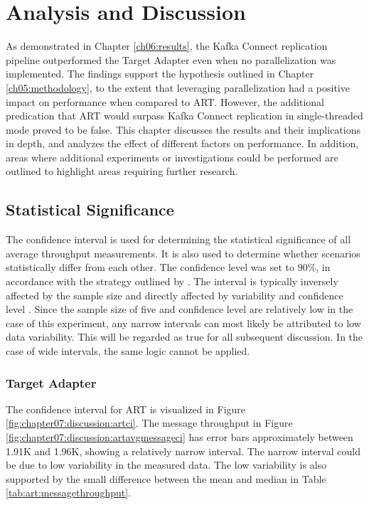\chapter{Analysis and Discussion}
\label{ch07:discussion}
As demonstrated in Chapter \ref{ch06:results}, the Kafka Connect replication pipeline outperformed the Target Adapter even when no parallelization was implemented. The findings support the hypothesis outlined in Chapter \ref{ch05:methodology}, to the extent that leveraging parallelization had a positive impact on performance when compared to \ac{ART}. However, the additional predication that \ac{ART} would surpass Kafka Connect replication in single-threaded mode proved to be false. This chapter discusses the results and their implications in depth, and analyzes the effect of different factors on performance. In addition, areas where additional experiments or investigations could be performed are outlined to highlight areas requiring further research.

\section{Statistical Significance}
\label{ch07:discussion:statsig}
The confidence interval is used for determining the statistical significance of all average throughput measurements. It is also used to determine whether scenarios statistically differ from each other. The confidence level was set to 90\%, in accordance with the strategy outlined by \citeauthor{jain1991computer} \cite{jain1991computer}. The interval is typically inversely affected by the sample size and directly affected by variability and confidence level \cite{hazrausingci}. Since the sample size of five and confidence level are relatively low in the case of this experiment, any narrow intervals can most likely be attributed to low data variability. This will be regarded as true for all subsequent discussion. In the case of wide intervals, the same logic cannot be applied.

\subsection{Target Adapter}
The confidence interval for \ac{ART} is visualized in Figure \ref{fig:chapter07:discussion:artci}. The message throughput in Figure \ref{fig:chapter07:discussion:artavgmessageci} has error bars approximately between 1.91K and 1.96K, showing a relatively narrow interval. The narrow interval could be due to low variability in the measured data. The low variability is also supported by the small difference between the mean and median in Table \ref{tab:art:messagethroughput}.

